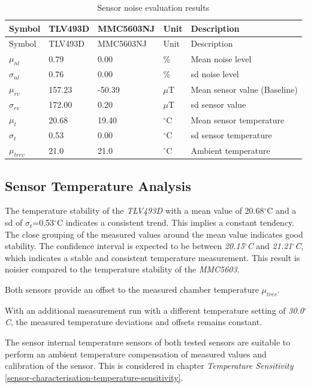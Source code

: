 \begin{longtable}[]{@{}lllll@{}}
\caption{Sensor noise evaluation results
\label{Sensor_noise_evaluation_results.csv}}\tabularnewline
\toprule
Symbol & TLV493D & MMC5603NJ & Unit & Description\tabularnewline
\midrule
\endfirsthead
\toprule
Symbol & TLV493D & MMC5603NJ & Unit & Description\tabularnewline
\midrule
\endhead
\(\mu_{nl}\) & 0.79 & 0.00 & \% & Mean noise level\tabularnewline
\(\sigma_{nl}\) & 0.76 & 0.00 & \% & \gls{sd} noise level\tabularnewline
\(\mu_{rv}\) & 157.23 & -50.39 & \(\mu\)T & Mean sensor value
(Baseline)\tabularnewline
\(\sigma_{rv}\) & 172.00 & 0.20 & \(\mu\)T & \gls{sd} sensor
value\tabularnewline
\(\mu_{t}\) & 20.68 & 19.40 & \(^{\circ}\)C & Mean sensor
temperature\tabularnewline
\(\sigma_{t}\) & 0.53 & 0.00 & \(^{\circ}\)C & \gls{sd} sensor
temperature\tabularnewline
\(\mu_{trev}\) & 21.0 & 21.0 & \(^{\circ}\)C & Ambient
temperature\tabularnewline
\bottomrule
\end{longtable}

\hypertarget{sensor-temperature-analysis}{%
\subsection{Sensor Temperature
Analysis}\label{sensor-temperature-analysis}}

The temperature stability of the \emph{TLV493D} with a mean value of
20.68\(^{\circ}\)C and a \gls{sd} of \(\sigma_{t}\)=0.53\(^{\circ}\)C
indicates a consistent trend. This implies a constant tendency. The
close grouping of the measured values around the mean value indicates
good stability. The confidence interval is expected to be between
\emph{20.15\(^{\circ}\)C} and \emph{21.21\(^{\circ}\)C}, which indicates
a stable and consistent temperature measurement. This result is noisier
compared to the temperature stability of the \emph{MMC5603}.

Both sensors provide an offset to the measured chamber temperature
\(\mu_{trev}\).

With an additional measurement run with a different temperature setting
of \emph{30.0\(^{\circ}\)C}, the measured temperature deviations and
offsets remains constant.

The sensor internal temperature sensors of both tested sensors are
suitable to perform an ambient temperature compensation of measured
values and calibration of the sensor. This is considered in chapter
\emph{Temperature Sensitivity}
\ref{sensor-characterisation-temperature-sensitivity}.


